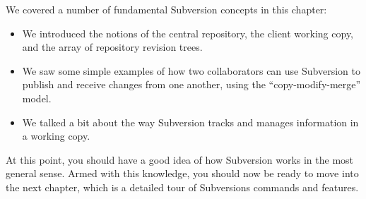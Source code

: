 We covered a number of fundamental Subversion concepts in this chapter:

\begin{itemize}
\item
  We introduced the notions of the central repository, the client
  working copy, and the array of repository revision trees.
\item
  We saw some simple examples of how two collaborators can use
  Subversion to publish and receive changes from one another, using the
  ``copy-modify-merge'' model.
\item
  We talked a bit about the way Subversion tracks and manages
  information in a working copy.
\end{itemize}

At this point, you should have a good idea of how Subversion works in
the most general sense. Armed with this knowledge, you should now be
ready to move into the next chapter, which is a detailed tour of
Subversion\textquotesingle s commands and features.

